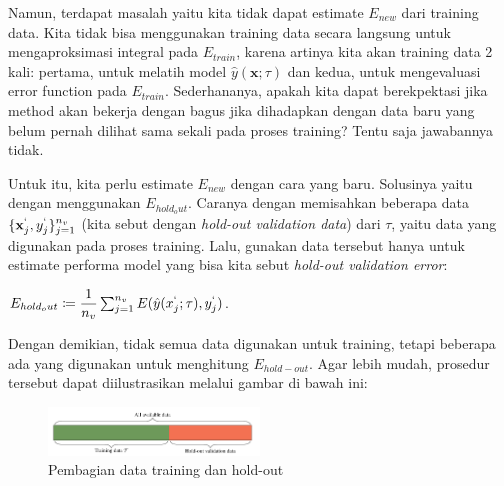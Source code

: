 \documentclass{article}
\begin{document}
Namun, terdapat masalah yaitu kita tidak dapat estimate $E_{new}$ dari training data. Kita tidak bisa menggunakan training data secara langsung untuk mengaproksimasi integral pada $E_{train }$, karena artinya kita akan training data 2 kali: pertama, untuk melatih model $\hat{y}(\mathbf{x};\tau)$ dan kedua, untuk mengevaluasi error function pada $E_{train}$. Sederhananya, apakah kita dapat berekpektasi jika method akan bekerja dengan bagus jika dihadapkan dengan data baru yang belum pernah dilihat sama sekali pada proses training? Tentu saja jawabannya tidak.

Untuk itu, kita perlu estimate $E_{new}$ dengan cara yang baru. Solusinya yaitu dengan menggunakan $E_{hold_out}$. Caranya dengan memisahkan beberapa data $\{\mathbf{x}^`_j,y^`_j\}^{n_v}_{j=1}$ (kita sebut dengan \textit{hold-out validation data}) dari $\tau$, yaitu data yang digunakan pada proses training. Lalu, gunakan data tersebut hanya untuk estimate performa model yang bisa kita sebut \textit{hold-out validation error}: \newline

$E_{hold_out} \coloneq \dfrac{1}{n_v} \sum^{n_v}_{j=1} E( \hat{y}(x^`_j;\tau),y^`_j)$. \newline

Dengan demikian, tidak semua data digunakan untuk training, tetapi beberapa ada yang digunakan untuk menghitung $E_{hold-out}$. Agar lebih mudah, prosedur tersebut dapat diilustrasikan melalui gambar di bawah ini:

\begin{figure}[h]
    \centering
    \includegraphics[width=0.5\textwidth]{fig/hold_out_val_data.png}
    \caption{Pembagian data training dan hold-out}
    \label{fig:hold_out_val_data}
\end{figure}
\end{document}
